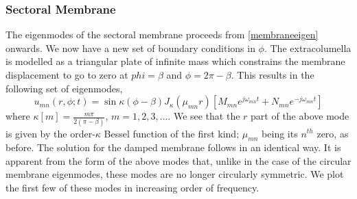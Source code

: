 \subsubsection{Sectoral Membrane}
The eigenmodes of the sectoral membrane proceeds from \eqref{membraneeigen} onwards. We now have a new set of boundary conditions in $\phi$.
The extracolumella is modelled as a triangular plate of infinite mass which constrains the membrane displacement to go to zero at $phi=\beta$
and $\phi=2\pi-\beta$. This results in the following set of eigenmodes,
\begin{equation}\label{sectoraleigenmode}
 u_{mn}(r,\phi;t)=\sin \kappa(\phi-\beta) J_\kappa(\mu_{mn} r)\left[M_{mn}e^{j\omega_{mn} t}+N_{mn}e^{-j\omega_{mn} t}\right]
\end{equation}
where $\kappa[m]=\frac{m\pi}{2(\pi-\beta)}$, $m=1,2,3,\ldots$. We see that the $r$ part of the above mode is given by the
order-$\kappa$ Bessel function of the first kind; $\mu_{mn}$ being its $n^{th}$ zero, as before. The solution for the damped
membrane follows in an identical way.
It is apparent from the form of the above modes that, unlike in the case of the circular membrane eigenmodes, these modes
are no longer circularly symmetric. We plot the first few of these modes in increasing order of frequency.

